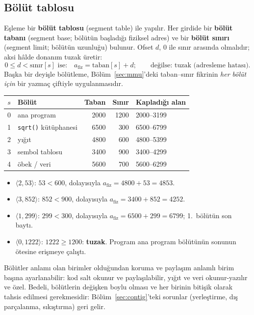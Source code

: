 \documentclass[11pt,a4paper]{article}
\newcommand{\term}[1]{\textbf{\color{mintdeep}#1}}
\begin{document}
\subsection{Bölüt tablosu}
\label{sec:segtable}

Eşleme bir \term{bölüt tablosu} (segment table) ile yapılır. Her girdide bir \term{bölüt tabanı} (segment base; bölütün başladığı fiziksel adres) ve bir \term{bölüt sınırı} (segment limit; bölütün uzunluğu) bulunur. Ofset $d$, $0$ ile sınır arasında olmalıdır; aksi hâlde donanım tuzak üretir:
\[
0 \le d < \text{sınır}[s] \text{ ise:}\quad a_{\text{fiz}} = \text{taban}[s] + d;\qquad\text{değilse: tuzak (adresleme hatası).}
\]
Başka bir deyişle bölütleme, Bölüm~\ref{sec:mmu}'deki taban--sınır fikrinin \emph{her bölüt için} bir yazmaç çiftiyle uygulanmasıdır.

\begin{example}
\begin{center}
\renewcommand{\arraystretch}{1.2}
\begin{tabular}{@{}clrrl@{}}
\toprule
$s$ & \textbf{Bölüt} & \textbf{Taban} & \textbf{Sınır} & \textbf{Kapladığı alan} \\
\midrule
0 & ana program & 2000 & 1200 & 2000--3199 \\
1 & \texttt{sqrt()} kütüphanesi & 6500 & 300 & 6500--6799 \\
2 & yığıt & 4800 & 600 & 4800--5399 \\
3 & sembol tablosu & 3400 & 900 & 3400--4299 \\
4 & öbek / veri & 5600 & 700 & 5600--6299 \\
\bottomrule
\end{tabular}
\end{center}
\begin{itemize}
  \item $\langle 2, 53\rangle$: $53 < 600$, dolayısıyla $a_{\text{fiz}} = 4800 + 53 = 4853$.
  \item $\langle 3, 852\rangle$: $852 < 900$, dolayısıyla $a_{\text{fiz}} = 3400 + 852 = 4252$.
  \item $\langle 1, 299\rangle$: $299 < 300$, dolayısıyla $a_{\text{fiz}} = 6500 + 299 = 6799$; 1.~bölütün son baytı.
  \item $\langle 0, 1222\rangle$: $1222 \ge 1200$: \textbf{tuzak}. Program ana program bölütünün sonunun ötesine erişmeye çalıştı.
\end{itemize}
\end{example}

Bölütler anlamı olan birimler olduğundan koruma ve paylaşım anlamlı birim başına ayarlanabilir: kod salt okunur ve paylaşılabilir, yığıt ve veri okunur-yazılır ve özel. Bedeli, bölütlerin değişken boylu olması ve her birinin bitişik olarak tahsis edilmesi gerekmesidir: Bölüm~\ref{sec:contig}'teki sorunlar (yerleştirme, dış parçalanma, sıkıştırma) geri gelir.
\end{document}
